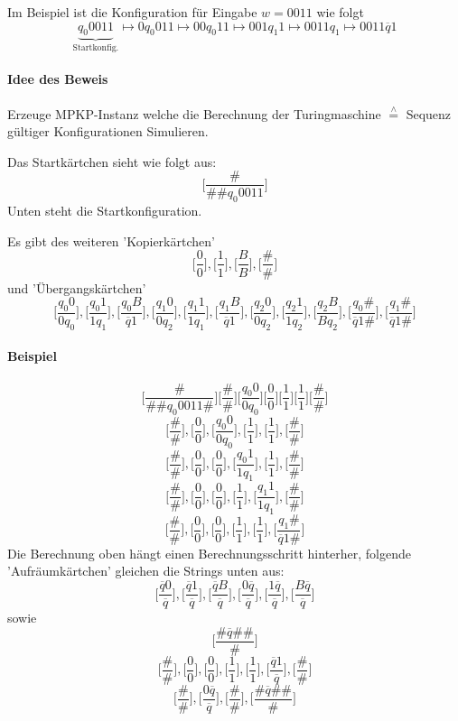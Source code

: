 \para{} Im Beispiel ist die Konfiguration für Eingabe $w=0011$ wie folgt $$ \underbrace{q_0 0011}_{\text{Startkonfig.}} \mapsto 0 q_0 011 \mapsto 00q_0 11 \mapsto 001q_1 1 \mapsto 0011q_1 \mapsto 0011\overline{q}1 $$

\paragraph*{Idee des Beweis} Erzeuge MPKP-Instanz welche die Berechnung der Turingmaschine $\overset{\wedge}{=}$ Sequenz gültiger Konfigurationen Simulieren.

\para{} Das Startkärtchen sieht wie folgt aus: $$\Big[ \frac{\#}{\#\#q_0 0011} \Big]$$ Unten steht die Startkonfiguration.

\para{} Es gibt des weiteren 'Kopierkärtchen' $$\Big[ \frac{0}{0} \Big], \Big[ \frac{1}{1} \Big], \Big[ \frac{B}{B} \Big], \Big[ \frac{\#}{\#} \Big]$$ und 'Übergangskärtchen' $$\Big[ \frac{q_0 0}{0q_0} \Big], \Big[ \frac{q_0 1}{1q_1} \Big], \Big[ \frac{q_0 B}{\overline{q}1} \Big], \Big[ \frac{q_1 0}{0q_2} \Big], \Big[ \frac{q_1 1}{1q_1} \Big], \Big[ \frac{q_1 B}{\overline{q}1} \Big], \Big[ \frac{q_2 0}{0q_2} \Big], \Big[ \frac{q_2 1}{1q_2} \Big], \Big[ \frac{q_2 B}{Bq_2} \Big], \Big[ \frac{q_0\#}{\overline{q}1\#} \Big], \Big[ \frac{q_1\#}{\overline{q}1\#} \Big]$$

\paragraph*{Beispiel} $$ \Big[ \frac{\#}{\#\#q_0 0011\#} \Big]\Big[ \frac{\#}{\#} \Big]\Big[ \frac{q_0 0}{0 q_0} \Big]\Big[ \frac{0}{0} \Big]\Big[ \frac{1}{1} \Big]\Big[ \frac{1}{1} \Big]\Big[ \frac{\#}{\#} \Big] $$
$$ \Big[ \frac{\#}{\#} \Big], \Big[ \frac{0}{0} \Big], \Big[ \frac{q_0 0}{0q_0} \Big], \Big[ \frac{1}{1} \Big], \Big[ \frac{1}{1} \Big], \Big[ \frac{\#}{\#} \Big] $$
$$ \Big[ \frac{\#}{\#} \Big], \Big[ \frac{0}{0} \Big], \Big[ \frac{0}{0} \Big], \Big[ \frac{q_0 1}{1q_1} \Big], \Big[ \frac{1}{1} \Big], \Big[ \frac{\#}{\#} \Big] $$
$$ \Big[ \frac{\#}{\#} \Big], \Big[ \frac{0}{0} \Big], \Big[ \frac{0}{0} \Big], \Big[ \frac{1}{1} \Big], \Big[ \frac{q_1 1}{1q_1} \Big], \Big[ \frac{\#}{\#} \Big] $$
$$ \Big[ \frac{\#}{\#} \Big], \Big[ \frac{0}{0} \Big], \Big[ \frac{0}{0} \Big], \Big[ \frac{1}{1} \Big], \Big[ \frac{1}{1} \Big], \Big[ \frac{q_1\#}{\overline{q}1\#} \Big] $$
Die Berechnung oben hängt einen Berechnungsschritt hinterher, folgende 'Aufräumkärtchen' gleichen die Strings unten aus: $$ \Big[ \frac{\overline{q}0}{\overline{q}} \Big], \Big[ \frac{\overline{q}1}{\overline{q}} \Big], \Big[ \frac{\overline{q}B}{\overline{q}} \Big], \Big[ \frac{0\overline{q}}{\overline{q}} \Big], \Big[ \frac{1\overline{q}}{\overline{q}} \Big], \Big[ \frac{B\overline{q}}{\overline{q}} \Big] $$ sowie $$\Big[ \frac{\#\overline{q}\#\#}{\#} \Big]$$
$$ \Big[ \frac{\#}{\#} \Big], \Big[ \frac{0}{0} \Big], \Big[ \frac{0}{0} \Big], \Big[ \frac{1}{1} \Big], \Big[ \frac{1}{1} \Big], \Big[ \frac{\overline{q}1}{\overline{q}} \Big], \Big[ \frac{\#}{\#} \Big] $$
$$ \Big[ \frac{\#}{\#} \Big], \Big[ \frac{0\overline{q}}{\overline{q}} \Big], \Big[ \frac{\#}{\#} \Big], \Big[ \frac{\#\overline{q}\#\#}{\#} \Big] $$
